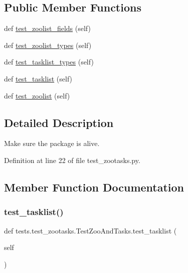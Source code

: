 \subsection*{Public Member Functions}
\begin{DoxyCompactItemize}
\item 
def \hyperlink{classtests_1_1test__zootasks_1_1TestZooAndTasks_a57e8f4db75b9eb31263d4e269c40068f}{test\+\_\+zoolist\+\_\+fields} (self)
\item 
def \hyperlink{classtests_1_1test__zootasks_1_1TestZooAndTasks_a8d7616fa41ed03322c86a565eedb4e8c}{test\+\_\+zoolist\+\_\+types} (self)
\item 
def \hyperlink{classtests_1_1test__zootasks_1_1TestZooAndTasks_ae25086584b24c10c24a9bda486b32c4a}{test\+\_\+tasklist\+\_\+types} (self)
\item 
def \hyperlink{classtests_1_1test__zootasks_1_1TestZooAndTasks_af33cbd4d8b989997428574cd787755ae}{test\+\_\+tasklist} (self)
\item 
def \hyperlink{classtests_1_1test__zootasks_1_1TestZooAndTasks_a1c1bb2568bc1871c11d14ac136a9e2b3}{test\+\_\+zoolist} (self)
\end{DoxyCompactItemize}


\subsection{Detailed Description}
\begin{DoxyVerb}Make sure the package is alive.\end{DoxyVerb}
 

Definition at line 22 of file test\+\_\+zootasks.\+py.



\subsection{Member Function Documentation}
\mbox{\label{classtests_1_1test__zootasks_1_1TestZooAndTasks_af33cbd4d8b989997428574cd787755ae}} 
\subsubsection{\texorpdfstring{test\+\_\+tasklist()}{test\_tasklist()}}
{\footnotesize\ttfamily def tests.\+test\+\_\+zootasks.\+Test\+Zoo\+And\+Tasks.\+test\+\_\+tasklist (\begin{DoxyParamCaption}\item[{}]{self }\end{DoxyParamCaption})}

